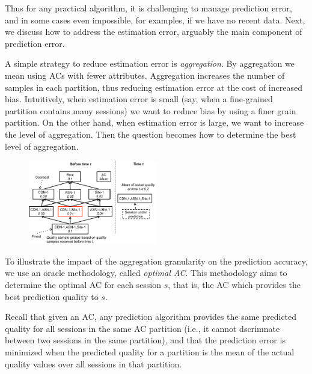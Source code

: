 Thus for any practical algorithm, it is challenging to manage
prediction error, and in some cases even impossible, for examples, if
we have no recent data. Next, we discuss how to address the estimation
error, arguably the main component of prediction error.

\label{subsec:aggregation}
A simple strategy to reduce estimation error is {\it aggregation}.  By
aggregation we mean using ACs with fewer attributes.  Aggregation
increases the number of samples in each partition, thus reducing
estimation error at the cost of increased bias.  Intuitively, when
estimation error is small (say, when a fine-grained partition contains
many sessions) we want to reduce bias by using a finer grain
partition.  On the other hand, when estimation error is large, we want
to increase the level of aggregation.  Then the question becomes how
to determine the best level of aggregation.


\begin{figure}[h!]
\centering
 \includegraphics[width=0.5\textwidth] {figures/fig-optimal-AC.pdf}
\label{fig:example-optimal-ac}
\end{figure}


To illustrate the impact of the aggregation granularity on the
prediction accuracy, we use an oracle methodology, called {\it optimal
  AC}. This methodology aims to determine the optimal AC for each
session $s$, that is, the AC which provides the best prediction
quality to $s$.

Recall that given an AC, any prediction algorithm provides the same
predicted quality for all sessions in the same AC partition (i.e., it
cannot dscrimnate between two sessions in the same partition), and
that the prediction error is minimized when the predicted quality for
a partition is the mean of the actual quality values over all sessions
in that partition.

